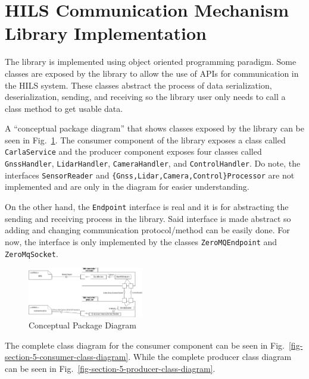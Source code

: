 \section{HILS Communication Mechanism Library Implementation}

The library is implemented using object oriented programming paradigm. Some
classes are exposed by the library to allow the use of APIs for communication in
the HILS system. These classes abstract the process of data serialization,
deserialization, sending, and receiving so the library user only needs to call a
class method to get usable data.

A ``conceptual package diagram'' that shows classes exposed by the library can
be seen in Fig.~\ref{fig-section-5-conceptual-package-diagram}. The consumer
component of the library exposes a class called \texttt{Car\-la\-Ser\-vice} and
the producer component exposes four classes called
\texttt{G\-n\-s\-s\-Hand\-ler}, \texttt{Li\-dar\-Hand\-ler},
\texttt{Ca\-me\-ra\-Hand\-ler}, and \texttt{Con\-trol\-Hand\-ler}. Do note, the
interfaces \texttt{SensorReader} and
\texttt{\{Gnss,Lidar,Camera,Control\}Processor} are not implemented and are only
in the diagram for easier understanding.

On the other hand, the \texttt{Endpoint} interface is real and it is for
abstracting the sending and receiving process in the library. Said interface is
made abstract so adding and changing communication protocol/method can be easily
done. For now, the interface is only implemented by the classes
\texttt{ZeroMQEndpoint} and \texttt{ZeroMqSocket}.

\begin{figure}[htbp]
	\centerline{\includegraphics[width=0.45\textwidth]{resources/chapter-4/conceptual-package-diagram.png}}
	\caption{Conceptual Package Diagram}
	\label{fig-section-5-conceptual-package-diagram}
\end{figure}

The complete class diagram for the consumer component can be seen in
Fig.~\ref{fig-section-5-consumer-class-diagram}. While the complete producer
class diagram can be seen in Fig.~\ref{fig-section-5-producer-class-diagram}.

